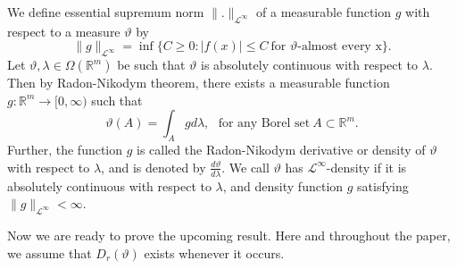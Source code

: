 \documentclass{amsproc}
\theoremstyle{definition}
\newtheorem{definition}[theorem]{Definition}
\theoremstyle{remark}
\numberwithin{equation}{section}
\begin{document}
We define essential supremum norm $\|.\|_{\mathcal{L}^{\infty}}$ of a measurable function $g$ with respect to a measure $\vartheta$ by 
\[
 \|g\|_{\mathcal{L}^{\infty}}= \inf \{C\ge 0 : |f(x)| \le C ~\text{for $\vartheta$-almost every x} \}.
\]
Let $\vartheta ,\lambda \in \Omega( \mathbb{R}^m)$ be such that $\vartheta$ is absolutely continuous with respect to $\lambda.$ Then by Radon-Nikodym theorem, there exists a measurable function $g: \mathbb{R}^m \to [0, \infty) $ such that $$ \vartheta(A)= \int_A g d\lambda,~~~\text{for any Borel set}~A \subset \mathbb{R}^m.$$
Further, the function $g$ is called the Radon-Nikodym derivative or density of $\vartheta$ with respect to $\lambda$, and is denoted by $\frac{ d\vartheta}{ d\lambda}.$
We call $\vartheta$ has $\mathcal{L}^{\infty}$-density if it is absolutely continuous with respect to $\lambda$, and density function $g$ satisfying
 $\|g\|_{\mathcal{L}^{\infty}} < \infty.$  
\par
Now we are ready to prove the upcoming result. Here and throughout the paper, we assume that $D_r(\vartheta)$ exists whenever it occurs.

\end{document}
